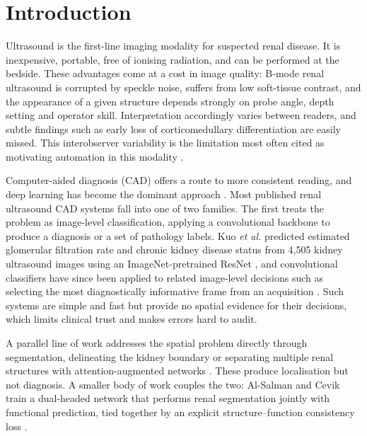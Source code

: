 \documentclass[pdflatex,sn-mathphys-num]{sn-jnl}
\theoremstyle{thmstyleone}%
\theoremstyle{thmstyletwo}%
\theoremstyle{thmstylethree}%
\begin{document}

\maketitle

\section{Introduction}\label{sec:intro}

Ultrasound is the first-line imaging modality for suspected renal disease. It is inexpensive,
portable, free of ionising radiation, and can be performed at the bedside. These advantages come
at a cost in image quality: B-mode renal ultrasound is corrupted by speckle noise, suffers from
low soft-tissue contrast, and the appearance of a given structure depends strongly on probe
angle, depth setting and operator skill. Interpretation accordingly varies between readers, and
subtle findings such as early loss of corticomedullary differentiation are easily missed. This
interobserver variability is the limitation most often cited as motivating automation in this
modality \cite{bib_renalreview}.

Computer-aided diagnosis (CAD) offers a route to more consistent reading, and deep learning has
become the dominant approach \cite{bib_renalreview}. Most published renal ultrasound CAD systems
fall into one of two families. The first treats the problem as image-level classification,
applying a convolutional backbone to produce a diagnosis or a set of pathology labels. Kuo
\textit{et al.} predicted estimated glomerular filtration rate and chronic kidney disease status
from 4,505 kidney ultrasound images using an ImageNet-pretrained ResNet \cite{bib_kuo2019}, and
convolutional classifiers have since been applied to related image-level decisions such as
selecting the most diagnostically informative frame from an acquisition \cite{bib_frameselect}.
Such systems are simple and fast but provide no spatial evidence for their decisions, which
limits clinical trust and makes errors hard to audit.

A parallel line of work addresses the spatial problem directly through segmentation, delineating
the kidney boundary \cite{bib_shtaiyat,bib_mseunet} or separating multiple renal structures with
attention-augmented networks \cite{bib_renalattn}. These produce localisation but not diagnosis.
A smaller body of work couples the two: Al-Salman and Cevik train a dual-headed network that
performs renal segmentation jointly with functional prediction, tied together by an explicit
structure--function consistency loss \cite{bib_fgckdunet}.
\end{document}
